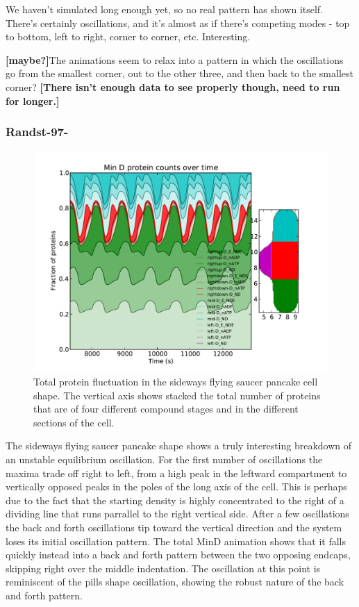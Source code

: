 \documentclass[letterpaper,twocolumn,amsmath,amssymb,pre]{revtex4-1}
\newcommand{\red}[1]{{\bf \color{red} #1}}
\newcommand{\fixme}[1]{\red{[#1]}}
\begin{document}
We haven't simulated long enough yet, so no real pattern has shown
itself.  There's certainly oscillations, and it's almost as if there's
competing modes - top to bottom, left to right, corner to corner, etc.
Interesting.

\fixme{maybe?}The animations seem to relax into a pattern in which the oscillations
go from the smallest corner, out to the other three, and then back to
the smallest corner?  \fixme{There isn't enough data to see properly
  though, need to run for longer.}

\subsubsection{Randst-97-}
\begin{figure}
  \includegraphics[width=\columnwidth]{../data/shape-randst/plots/box-plot_D--randst-25-800-600-9700-1500}
  \caption{Total protein fluctuation in the sideways flying saucer
    pancake cell shape.  The vertical axis shows stacked the total
    number of proteins that are of four different compound stages and
    in the different sections of the cell.}
  \label{total-oscillation-randst-97-plot}
\end{figure}

The sideways flying saucer pancake shape shows a truly interesting
breakdown of an unstable equilibrium oscillation.  For the first
number of oscillations the maxima trade off right to left, from a high
peak in the leftward compartment to vertically opposed peaks in the
poles of the long axis of the cell.  This is perhaps due to the fact
that the starting density is highly concentrated to the right of a
dividing line that runs parrallel to the right vertical side.  After a
few oscillations the back and forth oscillations tip toward the
vertical direction and the system loses its initial oscillation
pattern.  The total MinD animation shows that it falls quickly instead into a
back and forth pattern between the two opposing endcaps, skipping
right over the middle indentation.  The oscillation at this point is
reminiscent of the pills shape oscillation, showing the robust nature
of the back and forth pattern.
\end{document}
